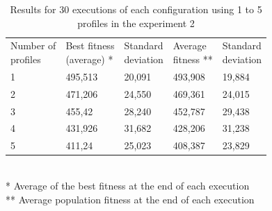 \documentclass[runningheads]{llncs}
\begin{document}
\begin{table}
\begin{center}
\caption{Results for 30 executions of each configuration using 1 to 5 profiles in the experiment 2}
\label{fig:exp2_30ex}
\begin{tabular}{lllll}
\hline\noalign{\smallskip}
\parbox[t]{2cm}{Number of\\ profiles} 
& \parbox[t]{2cm}{Best fitness\\(average) *} 
& \parbox[t]{2cm}{Standard\\deviation}
& \parbox[t]{2cm}{Average\\fitness **}
& \parbox[t]{2cm}{Standard\\deviation}\\
\noalign{\smallskip}
\hline
\noalign{\smallskip}
1 & 495,513 & 20,091 & 493,908 & 19,884 \\
2 & 471,206 & 24,550 & 469,361 & 24,015 \\
3 & 455,42 & 28,240 & 452,787 & 29,438 \\
4 & 431,926 & 31,682 & 428,206 & 31,238 \\
5 & 411,24 & 25,023 & 408,387 & 23,829 \\
\hline
\end{tabular}
\\
\** Average of the best fitness at the end of each execution\\
\*** Average population fitness  at the end of each execution \\
\end{center}
\end{table}
\end{document}
